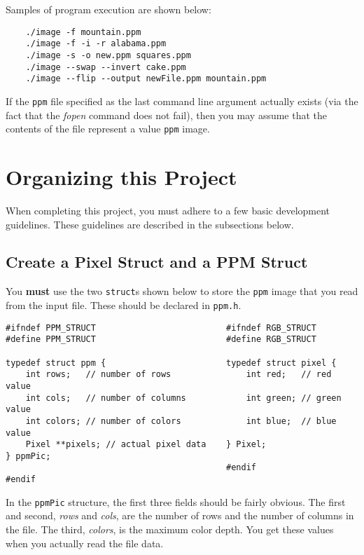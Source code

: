 \documentclass[12pt]{article}
\begin{document}
Samples of program execution are shown below:

\begin{verbatim}
    ./image -f mountain.ppm
    ./image -f -i -r alabama.ppm
    ./image -s -o new.ppm squares.ppm
    ./image --swap --invert cake.ppm
    ./image --flip --output newFile.ppm mountain.ppm
\end{verbatim}

If the {\tt ppm} file specified as the
last command line argument actually exists (via the fact that
the {\it fopen} command does not fail), then you may assume that the
contents of the file represent a value {\tt ppm} image.

\section*{Organizing this Project}

When completing this project, you must adhere to a few basic
development guidelines.  These guidelines are described in the
subsections below.

\subsection*{Create a Pixel Struct and a PPM Struct}
You {\bf must} use the two {\tt struct}s shown below 
to store the {\tt ppm} image that you read from the input file.
These should be declared in {\tt ppm.h}.

\begin{verbatim}
#ifndef PPM_STRUCT                          #ifndef RGB_STRUCT
#define PPM_STRUCT                          #define RGB_STRUCT

typedef struct ppm {                        typedef struct pixel {
    int rows;   // number of rows               int red;   // red value
    int cols;   // number of columns            int green; // green value
    int colors; // number of colors             int blue;  // blue value
    Pixel **pixels; // actual pixel data    } Pixel;
} ppmPic;
                                            #endif
#endif
\end{verbatim}

In the {\tt ppmPic} structure, the first three fields
should be fairly obvious.  The first and second, {\it rows} and
{\it cols}, are the number of rows and the number of columns in the file.
The third, {\it colors}, is the maximum color depth.
You get these values when you actually read the file data.
\end{document}
